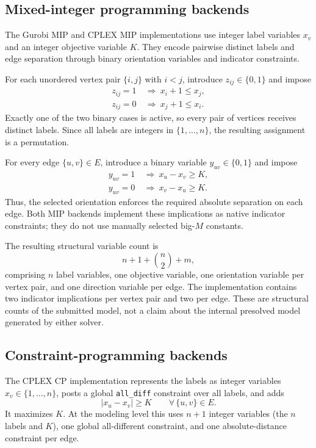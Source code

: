 \subsection{Mixed-integer programming backends}
The Gurobi MIP and CPLEX MIP implementations use integer label variables $x_v$ and an integer objective variable $K$. They encode pairwise distinct labels and edge separation through binary orientation variables and indicator constraints.

For each unordered vertex pair $\{i,j\}$ with $i<j$, introduce $z_{ij}\in\{0,1\}$ and impose
\begin{align}
  z_{ij}=1 &\ \Longrightarrow\ x_i+1\le x_j,\\
  z_{ij}=0 &\ \Longrightarrow\ x_j+1\le x_i.
\end{align}
Exactly one of the two binary cases is active, so every pair of vertices receives distinct labels. Since all labels are integers in $\{1,\ldots,n\}$, the resulting assignment is a permutation.

For every edge $\{u,v\}\in E$, introduce a binary variable $y_{uv}\in\{0,1\}$ and impose
\begin{align}
  y_{uv}=1 &\ \Longrightarrow\ x_u-x_v\ge K,\\
  y_{uv}=0 &\ \Longrightarrow\ x_v-x_u\ge K.
\end{align}
Thus, the selected orientation enforces the required absolute separation on each edge. Both MIP backends implement these implications as native indicator constraints; they do not use manually selected big-$M$ constants.

The resulting structural variable count is
\[
  n+1+\binom{n}{2}+m,
\]
comprising $n$ label variables, one objective variable, one orientation variable per vertex pair, and one direction variable per edge. The implementation contains two indicator implications per vertex pair and two per edge. These are structural counts of the submitted model, not a claim about the internal presolved model generated by either solver.

\subsection{Constraint-programming backends}
The CPLEX CP implementation represents the labels as integer variables $x_v\in\{1,\ldots,n\}$, posts a global \texttt{all\_diff} constraint over all labels, and adds
\[
  |x_u-x_v|\ge K
  \qquad \forall\,\{u,v\}\in E.
\]
It maximizes $K$. At the modeling level this uses $n+1$ integer variables (the $n$ labels and $K$), one global all-different constraint, and one absolute-distance constraint per edge.

